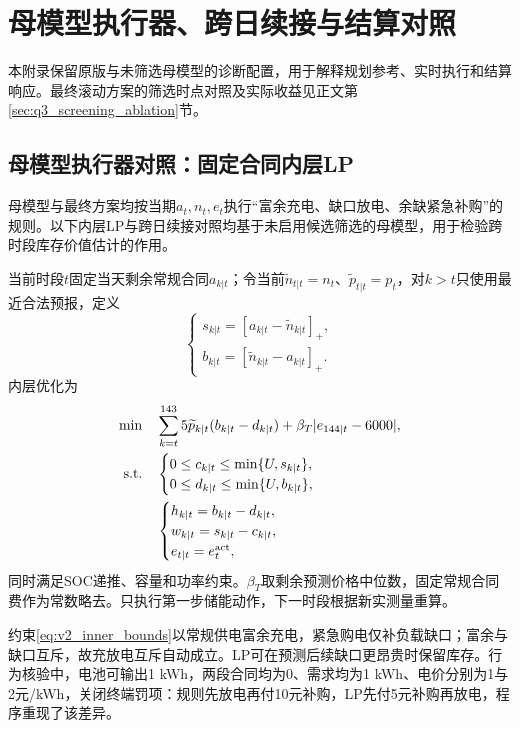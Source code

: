 \section{母模型执行器、跨日续接与结算对照}
\label{app:controllers}

本附录保留原版与未筛选母模型的诊断配置，用于解释规划参考、实时执行和结算响应。最终滚动方案的筛选时点对照及实际收益见正文第\ref{sec:q3_screening_ablation}节。

\subsection{母模型执行器对照：固定合同内层LP}

母模型与最终方案均按当期$a_t,n_t,e_t$执行“富余充电、缺口放电、余缺紧急补购”的规则。以下内层LP与跨日续接对照均基于未启用候选筛选的母模型，用于检验跨时段库存价值估计的作用。

当前时段$t$固定当天剩余常规合同$a_{k|t}$；令当前$\widetilde n_{t|t}=n_t$、$\widetilde p_{t|t}=p_t$，对$k>t$只使用最近合法预报，定义
\begin{equation}
 \begin{cases}
 s_{k|t}=[a_{k|t}-\widetilde n_{k|t}]_+,\\[2pt]
 b_{k|t}=[\widetilde n_{k|t}-a_{k|t}]_+.
 \end{cases}
 \label{eq:v2_surplus_deficit}
\end{equation}
内层优化为
\begin{align}
 \min\quad&\sum_{k=t}^{143}5\widetilde p_{k|t}(b_{k|t}-d_{k|t})
       +\beta_T|e_{144|t}-6000|,\label{eq:v2_inner_objective}\\
 \text{s.t.}\quad&\begin{cases}
 0\le c_{k|t}\le\min\{U,s_{k|t}\},\\
 0\le d_{k|t}\le\min\{U,b_{k|t}\},
 \end{cases}\label{eq:v2_inner_bounds}\\
 &\begin{cases}
 h_{k|t}=b_{k|t}-d_{k|t},\\
 w_{k|t}=s_{k|t}-c_{k|t},\\
 e_{t|t}=e_t^{\rm act},
 \end{cases}
 \label{eq:v2_inner_balance}
\end{align}
同时满足SOC递推、容量和功率约束。$\beta_T$取剩余预测价格中位数，固定常规合同费作为常数略去。只执行第一步储能动作，下一时段根据新实测量重算。

约束\eqref{eq:v2_inner_bounds}以常规供电富余充电，紧急购电仅补负载缺口；富余与缺口互斥，故充放电互斥自动成立。LP可在预测后续缺口更昂贵时保留库存。行为核验中，电池可输出1 kWh，两段合同均为0、需求均为1 kWh、电价分别为1与2元/kWh，关闭终端罚项：规则先放电再付10元补购，LP先付5元补购再放电，程序重现了该差异。

